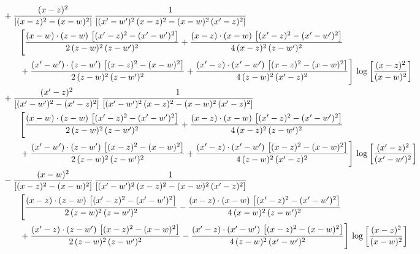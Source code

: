 \documentclass[10pt]{article}
\numberwithin{equation}{section}
\begin{document}
\begin{align}
&\qquad+\frac{(x-z)^{2}}{\left[(x-z)^{2}-(x-w)^{2}\right]}\,\frac{1}{\left[(x^{\prime}-w^{\prime})^{2}\,(x-z)^{2} - (x-w)^{2}\,(x^{\prime}-z)^{2}\right]}\notag\\&\qquad\qquad  \Bigg[\frac{(x-w)\cdot (z-w)\, \left[(x^{\prime}-z)^{2}-(x^{\prime}-w^{\prime})^{2}\right]}{2\, (z-w)^{2}\, (z-w^{\prime})^{2}}  + \frac{(x-z)\cdot (x-w)\,\left[(x^{\prime}-z)^{2}-(x^{\prime}-w^{\prime})^{2}\right] }{4\,(x-z)^{2}\,(z-w^{\prime})^{2}}\notag\\&\qquad\qquad  +\frac{(x^{\prime}-w^{\prime})\cdot (z-w^{\prime})\, \left[(x-z)^{2}-(x-w)^{2}\right]}{2\, (z-w)^{2}\, (z-w^{\prime})^{2}}+ \frac{(x^{\prime}-z)\cdot (x^{\prime}-w^{\prime})\, \left[(x-z)^{2}-(x-w)^{2}\right]}{4\, (z-w)^{2}\,(x^{\prime}-z)^{2}}\Bigg]\, \log{\left[\frac{(x-z)^{2}}{(x-w)^{2}}\right]}\notag\\
&\qquad+\frac{(x^{\prime}-z)^{2}}{\left[(x^{\prime}-w^{\prime})^{2}-(x^{\prime}-z)^{2}\right]}\,\frac{1}{\left[(x^{\prime}-w^{\prime})^{2}\,(x-z)^{2} - (x-w)^{2}\,(x^{\prime}-z)^{2}\right]}\notag\\&\qquad\qquad  \Bigg[\frac{(x-w)\cdot (z-w)\, \left[(x^{\prime}-z)^{2}-(x^{\prime}-w^{\prime})^{2}\right]}{2\, (z-w)^{2}\, (z-w^{\prime})^{2}}  + \frac{(x-z)\cdot (x-w)\,\left[(x^{\prime}-z)^{2}-(x^{\prime}-w^{\prime})^{2}\right] }{4\,(x-z)^{2}\,(z-w^{\prime})^{2}}\notag\\&\qquad\qquad  +\frac{(x^{\prime}-w^{\prime})\cdot (z-w^{\prime})\, \left[(x-z)^{2}-(x-w)^{2}\right]}{2\, (z-w)^{2}\, (z-w^{\prime})^{2}}+ \frac{(x^{\prime}-z)\cdot (x^{\prime}-w^{\prime})\, \left[(x-z)^{2}-(x-w)^{2}\right]}{4\, (z-w)^{2}\,(x^{\prime}-z)^{2}}\Bigg]\, \log{\left[\frac{(x^{\prime}-z)^{2}}{(x^{\prime}-w^{\prime})^{2}}\right]}\notag\\
&\qquad-\frac{(x-w)^{2}}{\left[(x-z)^{2}-(x-w)^{2}\right]}\, \frac{1}{\left[(x^{\prime}-w^{\prime})^{2}\, (x-z)^{2} - (x-w)^{2}\, (x^{\prime}-z)^{2}\right]} \notag\\&\qquad\qquad  \Bigg[\frac{(x-z)\cdot (z-w)\, \left[(x^{\prime}-z)^{2}-(x^{\prime}-w^{\prime})^{2}\right]}{2\, (z-w)^{2}\, (z-w^{\prime})^{2}}  - \frac{(x-z)\cdot (x-w)\,\left[(x^{\prime}-z)^{2}-(x^{\prime}-w^{\prime})^{2}\right] }{4\,(x-w)^{2}\,(z-w^{\prime})^{2}}\notag\\&\qquad\qquad  +\frac{(x^{\prime}-z)\cdot (z-w^{\prime})\, \left[(x-z)^{2}-(x-w)^{2}\right]}{2\, (z-w)^{2}\, (z-w^{\prime})^{2}}-\frac{(x^{\prime}-z)\cdot (x^{\prime}-w^{\prime})\, \left[(x-z)^{2}-(x-w)^{2}\right]}{4\, (z-w)^{2}\,(x^{\prime}-w^{\prime})^{2}}\Bigg]\, \log{\left[\frac{(x-z)^{2}}{(x-w)^{2}}\right]}\notag\\

\end{align}
\end{document}
